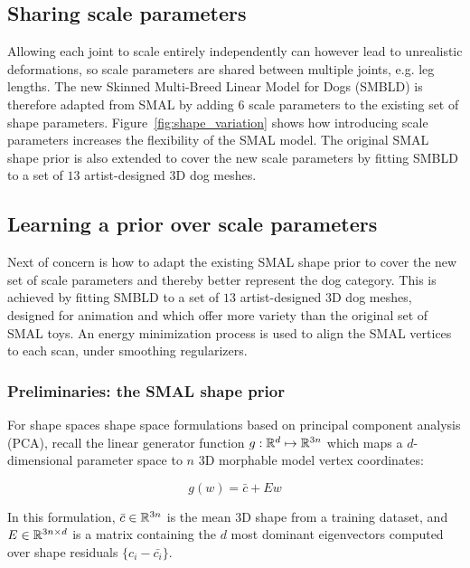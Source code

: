 \subsection{Sharing scale parameters}

Allowing each joint to scale entirely independently can however lead to unrealistic deformations, so scale parameters are shared between multiple joints, e.g. leg lengths. The new Skinned Multi-Breed Linear Model for Dogs (SMBLD) is therefore adapted from SMAL by adding $6$ scale parameters to the existing set of shape parameters. Figure~\ref{fig:shape_variation} shows how introducing scale parameters increases the flexibility of the SMAL model. The original SMAL shape prior is also extended to cover the new scale parameters by fitting SMBLD to a set of $13$ artist-designed 3D dog meshes. 



\subsection{Learning a prior over scale parameters}

Next of concern is how to adapt the existing SMAL shape prior to cover the new set of scale parameters and thereby better represent the dog category. This is achieved by fitting SMBLD to a set of $13$ artist-designed 3D dog meshes, designed for animation and which offer more variety than the original set of SMAL toys. An energy minimization process is used to align the SMAL vertices to each scan, under smoothing regularizers. 

\subsubsection{Preliminaries: the SMAL shape prior}
For shape spaces shape space formulations based on principal component analysis (PCA), recall the linear generator function $g: {\mathbb{R}^{d}} \mapsto {\mathbb{R}^{3n}}$ which maps a $d$-dimensional parameter space to $n$ 3D morphable model vertex coordinates: 

\begin{equation}
    g(w) = \bar{c} + Ew
\end{equation}

In this formulation, $\bar{c} \in {\mathbb{R}^{3n}}$ is the mean 3D shape from a training dataset, and $E \in {\mathbb{R}^{3n \times d}}$ is a matrix containing the $d$ most dominant eigenvectors computed over shape residuals $\{c_i - \bar{c_i}\}$. 

